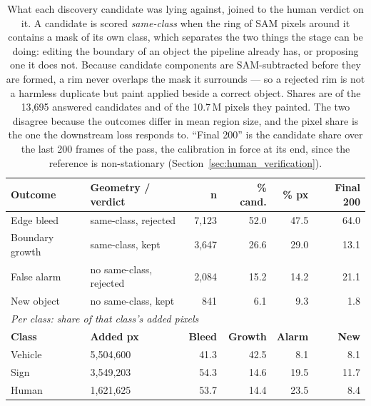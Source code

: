 %
\begin{table}[t]
\centering
\caption{What each discovery candidate was lying against, joined to the human verdict on it.
         A candidate is scored \emph{same-class} when the ring of SAM pixels around it contains a mask
         of its own class, which separates the two things the stage can be doing: editing the boundary
         of an object the pipeline already has, or proposing one it does not.
         Because candidate components are SAM-subtracted before they are formed, a rim never overlaps
         the mask it surrounds --- so a rejected rim is not a harmless duplicate but paint applied
         beside a correct object.
         Shares are of the 13{,}695 answered candidates and of the 10.7\,M pixels they painted.
         The two disagree because the outcomes differ in mean region size, and the pixel share is the
         one the downstream loss responds to.
         ``Final 200'' is the candidate share over the last 200 frames of the pass, the calibration in
         force at its end, since the reference is non-stationary
         (Section~\ref{sec:human_verification}).}
\label{tab:discovery_geometry}
\begin{tabular}{llrrrr}
\toprule
\textbf{Outcome} & \textbf{Geometry / verdict} & \textbf{n} & \textbf{\% cand.} & \textbf{\% px} & \textbf{Final 200} \\
\midrule
Edge bleed      & same-class, rejected & 7{,}123 & 52.0 & 47.5 & 64.0 \\
Boundary growth & same-class, kept     & 3{,}647 & 26.6 & 29.0 & 13.1 \\
False alarm     & no same-class, rejected & 2{,}084 & 15.2 & 14.2 & 21.1 \\
New object      & no same-class, kept  &    841 &  6.1 &  9.3 &  1.8 \\
\midrule
\multicolumn{6}{l}{\textit{Per class: share of that class's added pixels}} \\
\textbf{Class} & \textbf{Added px} & \textbf{Bleed} & \textbf{Growth} & \textbf{Alarm} & \textbf{New} \\
\midrule
Vehicle & 5{,}504{,}600 & 41.3 & 42.5 &  8.1 &  8.1 \\
Sign    & 3{,}549{,}203 & 54.3 & 14.6 & 19.5 & 11.7 \\
Human   & 1{,}621{,}625 & 53.7 & 14.4 & 23.5 &  8.4 \\
\bottomrule
\end{tabular}
\end{table}
